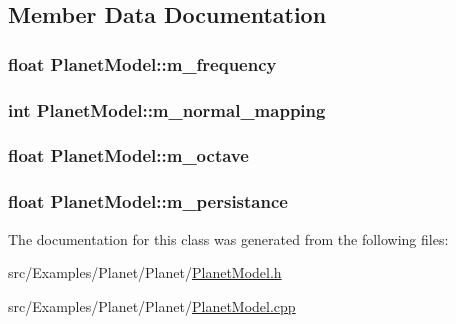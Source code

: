 \subsection{Member Data Documentation}
\hypertarget{class_planet_model_a3a085d9ea92c44a1404b06fa8a368176}{
\subsubsection[{m\+\_\+frequency}]{\setlength{\rightskip}{0pt plus 5cm}float Planet\+Model\+::m\+\_\+frequency}}\label{class_planet_model_a3a085d9ea92c44a1404b06fa8a368176}
\hypertarget{class_planet_model_a9aab0eb4b59ba73d9b13104526e64b74}{
\subsubsection[{m\+\_\+normal\+\_\+mapping}]{\setlength{\rightskip}{0pt plus 5cm}int Planet\+Model\+::m\+\_\+normal\+\_\+mapping}}\label{class_planet_model_a9aab0eb4b59ba73d9b13104526e64b74}
\hypertarget{class_planet_model_a5af782ac76afb9b21346effc0fda0bde}{
\subsubsection[{m\+\_\+octave}]{\setlength{\rightskip}{0pt plus 5cm}float Planet\+Model\+::m\+\_\+octave}}\label{class_planet_model_a5af782ac76afb9b21346effc0fda0bde}
\hypertarget{class_planet_model_a89ed4daf68550bcbfe414ee96379649b}{
\subsubsection[{m\+\_\+persistance}]{\setlength{\rightskip}{0pt plus 5cm}float Planet\+Model\+::m\+\_\+persistance}}\label{class_planet_model_a89ed4daf68550bcbfe414ee96379649b}


The documentation for this class was generated from the following files\+:\begin{DoxyCompactItemize}
\item 
src/\+Examples/\+Planet/\+Planet/\hyperlink{_planet_model_8h}{Planet\+Model.\+h}\item 
src/\+Examples/\+Planet/\+Planet/\hyperlink{_planet_model_8cpp}{Planet\+Model.\+cpp}\end{DoxyCompactItemize}
